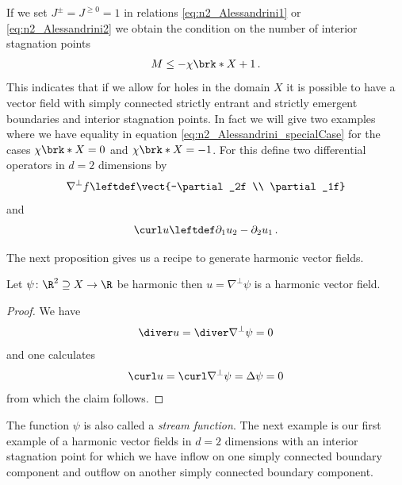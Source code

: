 If we set $J^\pm=J^{\geq0}=1$ in relations \eqref{eq:n2_Alessandrini1} or \eqref{eq:n2_Alessandrini2}
we obtain the condition on the number of interior stagnation points
\begin{align}
  M\leq-\chi\brk*{X}+1\,.\label{eq:n2_Alessandrini_specialCase}
\end{align}
This indicates that if we allow for holes in the domain $X$ it is possible to have a vector field with simply
connected strictly entrant and strictly emergent boundaries  and interior stagnation points.
In fact we will give two examples where we have equality in equation \eqref{eq:n2_Alessandrini_specialCase}
for the cases $\chi\brk*{X}=0$ and $\chi\brk*{X}=-1$.
For this define two differential operators in $d=2$ dimensions by
\begin{align}
  \nabla^\perp f\leftdef\vect{-\partial_2f \\ \partial_1f}\label{eq:n2_nablaPerp}
\end{align}
and
\begin{align}
  \curl u\leftdef\partial_1u_2-\partial_2u_1\,.\label{eq:n2_curl}
\end{align}

The next proposition gives us a recipe to generate harmonic vector fields.
\begin{proposition}
  Let $\psi\colon\R^2\supseteq X\to\R$ be harmonic then $u=\nabla^\perp\psi$ is a harmonic vector field.
\end{proposition} 
\begin{proof}
  We have
  \begin{align*}
    \diver u = \diver\nabla^\perp \psi=0
  \end{align*}
  and one calculates
  \begin{align*}
    \curl u = \curl\nabla^\perp \psi = \Delta \psi = 0
  \end{align*}
  from which the claim follows.
\end{proof}
The function $\psi$ is also called a \emph{stream function}.
The next example is our first example of a harmonic vector fields
in $d=2$ dimensions with an interior stagnation point for which 
we have inflow on one simply connected boundary component and outflow on another simply connected boundary
component.

